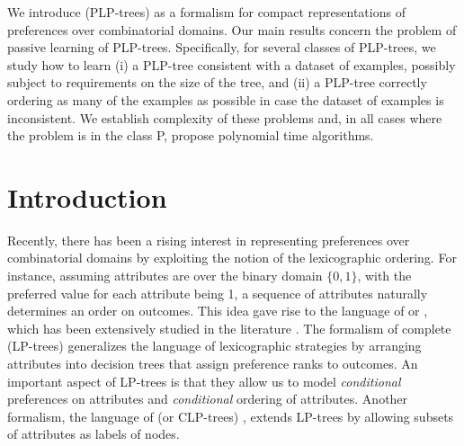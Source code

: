 We introduce  (PLP-trees) 
as a formalism for compact representations of preferences over 
combinatorial domains. Our main results concern the problem of passive 
learning of PLP-trees. Specifically, for several classes of 
PLP-trees, we study how to learn (i) a PLP-tree consistent with a 
dataset of examples, possibly subject to requirements on the size 
of the tree, and (ii) a PLP-tree correctly ordering as many of 
the examples as possible in case the dataset of examples is inconsistent. 
We establish complexity of these problems and, in all cases where the 
problem is in the class P, propose polynomial time algorithms.

\section{Introduction}

Recently, there has been a rising interest in representing
preferences over combinatorial domains by exploiting the notion of
the lexicographic ordering. For instance, assuming attributes are over the  
binary domain $\{0,1\}$, with the preferred value for each attribute being 
1, a sequence of attributes naturally determines an order on outcomes.
This idea gave rise to the language of  or , which has been extensively 
studied in the literature \cite{schmitt2006complexity,dombi2007learning,%
yaman2008democratic}. The formalism of complete  (LP-trees) \cite{booth:learningLP} generalizes the
language of lexicographic strategies by arranging attributes into 
decision trees that assign preference ranks to outcomes. An important
aspect of LP-trees is that they allow us to model \emph{conditional}
preferences on attributes and \emph{conditional} ordering of attributes. 
Another formalism,
the language of  (or 
CLP-trees) \cite{brauning2012learning}, extends LP-trees by allowing 
subsets of attributes as labels of nodes.

